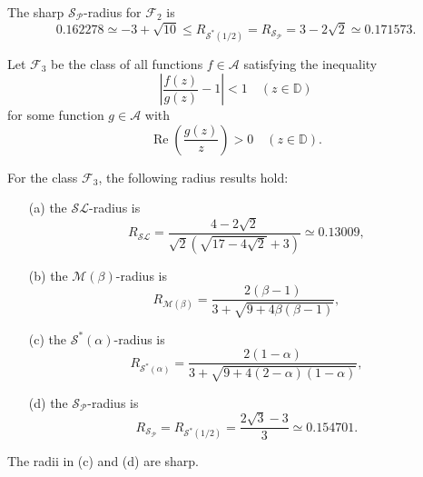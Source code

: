 \documentclass{amsart}
\begin{document}
\begin{conjecture}
The sharp ${\mathcal{S}_{\mathcal{P}}}$-radius for $\mathcal{F}_2$ is
\[0.162278\simeq-3+\sqrt{10}\leq R_{\mathcal{S}^*{( 1/2 )}}= R_{\mathcal{S}_{\mathcal{P}}}=3-2\sqrt2\simeq0.171573.\]
\end{conjecture}

Let $\mathcal{F}_3$ be the class of all functions $f\in \mathcal{A}$ satisfying the inequality
\[  \left|\frac{f(z)}{g(z)}-1 \right|<1 \quad ( z\in \mathbb{D})\]
for some function $g\in \mathcal{A}$ with
\[ \operatorname{Re} \left(\frac{g(z)}{z}\right)>0 \quad ( z\in \mathbb{D}).\]

\begin{theorem}\label{th5b}
For the class  $\mathcal{F}_3$,    the following radius results hold:
 \begin{enumerate}
  \item[(a)]\label{i1} the $ {\mathcal{SL}} $-radius is  \[R_{\mathcal{SL}}= \frac{4-2\sqrt2}{ \sqrt2(\sqrt{17-4\sqrt2}+3)}\simeq0.13009,\]

  \item[(b)]\label{i2} the $ {\mathcal{M}(\beta)} $-radius  is   \[R_{\mathcal{M}(\beta)}= \frac{2(\beta-1)}{3+\sqrt{9+4\beta(\beta-1)}},\]

  \item[(c)]\label{ii2}the $ {\mathcal{S}^*(\alpha)} $-radius  is \[R_{\mathcal{S}^*(\alpha)}=\frac{2(1-\alpha )}{3+\sqrt{9+4(2-\alpha )(1-\alpha )}},\]

  \item[(d)]\label{i6} the ${\mathcal{S}_{\mathcal{P}}} $-radius  is  \[R_{\mathcal{S}_{\mathcal{P}}}=
  R_{\mathcal{S}^*{( 1/2)}}=\frac{2\sqrt{3}-3}{3}\simeq0.154701.\]
 \end{enumerate}
The radii in (c) and (d) are sharp.
\end{theorem}
\end{document}
